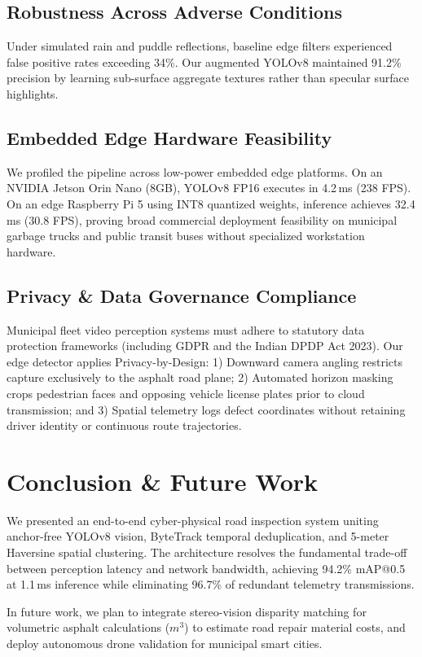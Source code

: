\documentclass[conference]{IEEEtran}
\begin{document}
\subsection{Robustness Across Adverse Conditions}
Under simulated rain and puddle reflections, baseline edge filters experienced false positive rates exceeding 34\%. Our augmented YOLOv8 maintained 91.2\% precision by learning sub-surface aggregate textures rather than specular surface highlights.

\subsection{Embedded Edge Hardware Feasibility}
We profiled the pipeline across low-power embedded edge platforms. On an NVIDIA Jetson Orin Nano (8GB), YOLOv8 FP16 executes in 4.2\,ms (238 FPS). On an edge Raspberry Pi 5 using INT8 quantized weights, inference achieves 32.4\,ms (30.8 FPS), proving broad commercial deployment feasibility on municipal garbage trucks and public transit buses without specialized workstation hardware.

\subsection{Privacy \& Data Governance Compliance}
Municipal fleet video perception systems must adhere to statutory data protection frameworks (including GDPR and the Indian DPDP Act 2023). Our edge detector applies Privacy-by-Design: 1) Downward camera angling restricts capture exclusively to the asphalt road plane; 2) Automated horizon masking crops pedestrian faces and opposing vehicle license plates prior to cloud transmission; and 3) Spatial telemetry logs defect coordinates without retaining driver identity or continuous route trajectories.

\section{Conclusion \& Future Work}
We presented an end-to-end cyber-physical road inspection system uniting anchor-free YOLOv8 vision, ByteTrack temporal deduplication, and 5-meter Haversine spatial clustering. The architecture resolves the fundamental trade-off between perception latency and network bandwidth, achieving 94.2\% mAP@0.5 at 1.1\,ms inference while eliminating 96.7\% of redundant telemetry transmissions.

In future work, we plan to integrate stereo-vision disparity matching for volumetric asphalt calculations ($m^3$) to estimate road repair material costs, and deploy autonomous drone validation for municipal smart cities.
\end{document}
